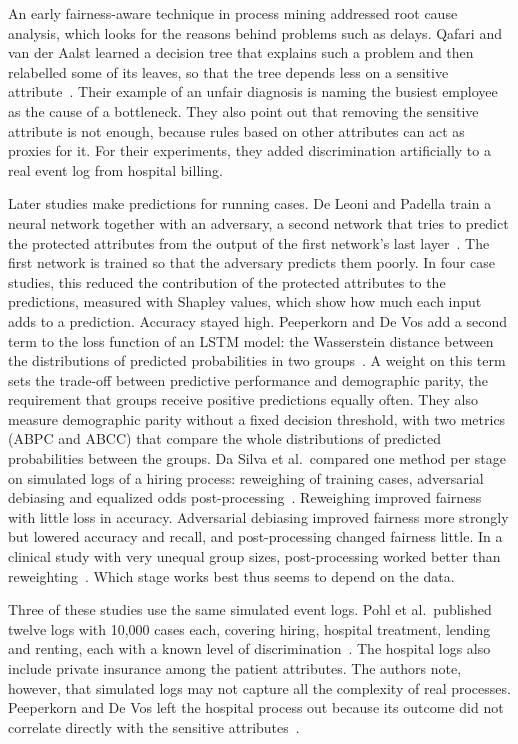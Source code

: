 An early fairness-aware technique in process mining addressed root cause analysis, which looks for the reasons behind problems such as delays. Qafari and van der Aalst learned a decision tree that explains such a problem and then relabelled some of its leaves, so that the tree depends less on a sensitive attribute~\cite{qafari2019fairness}. Their example of an unfair diagnosis is naming the busiest employee as the cause of a bottleneck. They also point out that removing the sensitive attribute is not enough, because rules based on other attributes can act as proxies for it. For their experiments, they added discrimination artificially to a real event log from hospital billing.

Later studies make predictions for running cases. De Leoni and Padella train a neural network together with an adversary, a second network that tries to predict the protected attributes from the output of the first network's last layer~\cite{deleoni2025achieving}. The first network is trained so that the adversary predicts them poorly. In four case studies, this reduced the contribution of the protected attributes to the predictions, measured with Shapley values, which show how much each input adds to a prediction. Accuracy stayed high. Peeperkorn and De Vos add a second term to the loss function of an LSTM model: the Wasserstein distance between the distributions of predicted probabilities in two groups~\cite{peeperkorn2025achieving}. A weight on this term sets the trade-off between predictive performance and demographic parity, the requirement that groups receive positive predictions equally often. They also measure demographic parity without a fixed decision threshold, with two metrics (ABPC and ABCC) that compare the whole distributions of predicted probabilities between the groups. Da Silva et al.\ compared one method per stage on simulated logs of a hiring process: reweighing of training cases, adversarial debiasing and equalized odds post-processing~\cite{dasilva2025towards}. Reweighing improved fairness with little loss in accuracy. Adversarial debiasing improved fairness more strongly but lowered accuracy and recall, and post-processing changed fairness little. In a clinical study with very unequal group sizes, post-processing worked better than reweighting~\cite{sanchezmarques2026addressing}. Which stage works best thus seems to depend on the data.

Three of these studies use the same simulated event logs. Pohl et al.\ published twelve logs with 10,000 cases each, covering hiring, hospital treatment, lending and renting, each with a known level of discrimination~\cite{pohl2023collection}. The hospital logs also include private insurance among the patient attributes. The authors note, however, that simulated logs may not capture all the complexity of real processes. Peeperkorn and De Vos left the hospital process out because its outcome did not correlate directly with the sensitive attributes~\cite{peeperkorn2025achieving}.

